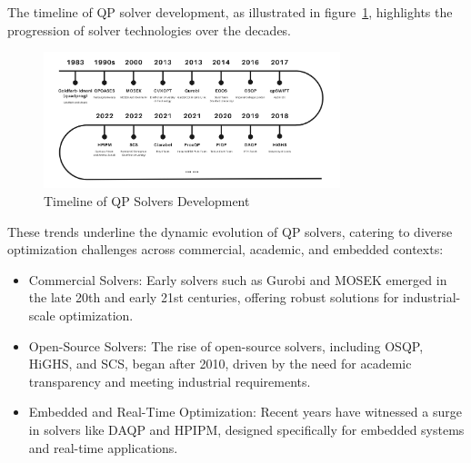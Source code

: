 \documentclass{article}
\begin{document}
The timeline of QP solver development, as illustrated in figure~\ref{fig:timeline}, highlights the progression of solver technologies over the decades. 

\begin{figure}[ht]
\centering
\includegraphics[width=0.77\textwidth]{fig/timeline.jpg}
\caption{Timeline of QP Solvers Development}
\label{fig:timeline}
\end{figure}

These trends underline the dynamic evolution of QP solvers, catering to diverse optimization challenges across commercial, academic, and embedded contexts: 

\begin{itemize}
    \item \textup{Commercial Solvers:} Early solvers such as Gurobi and MOSEK emerged in the late 20th and early 21st centuries, offering robust solutions for industrial-scale optimization.
    \item \textup{Open-Source Solvers:} The rise of open-source solvers, including OSQP, HiGHS, and SCS, began after 2010, driven by the need for academic transparency and meeting industrial requirements.
    \item \textup{Embedded and Real-Time Optimization:} Recent years have witnessed a surge in solvers like DAQP and HPIPM, designed specifically for embedded systems and real-time applications.
\end{itemize}
\end{document}
